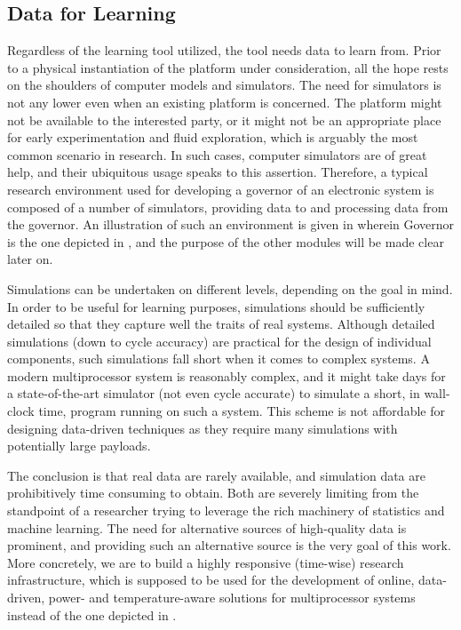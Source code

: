 \subsection{Data for Learning} 

Regardless of the learning tool utilized, the tool needs data to learn from.
Prior to a physical instantiation of the platform under consideration, all the
hope rests on the shoulders of computer models and simulators. The need for
simulators is not any lower even when an existing platform is concerned. The
platform might not be available to the interested party, or it might not be an
appropriate place for early experimentation and fluid exploration, which is
arguably the most common scenario in research. In such cases, computer
simulators are of great help, and their ubiquitous usage speaks to this
assertion. Therefore, a typical research environment used for developing a
governor of an electronic system is composed of a number of simulators,
providing data to and processing data from the governor. An illustration of such
an environment is given in  wherein Governor is the one
depicted in , and the purpose of the other modules will be made
clear later on.

Simulations can be undertaken on different levels, depending on the goal in
mind. In order to be useful for learning purposes, simulations should be
sufficiently detailed so that they capture well the traits of real systems.
Although detailed simulations (down to cycle accuracy) are practical for the
design of individual components, such simulations fall short when it comes to
complex systems. A modern multiprocessor system is reasonably complex, and it
might take days for a state-of-the-art simulator (not even cycle accurate) to
simulate a short, in wall-clock time, program running on such a system. This
scheme is not affordable for designing data-driven techniques as they require
many simulations with potentially large payloads.

The conclusion is that real data are rarely available, and simulation data are
prohibitively time consuming to obtain. Both are severely limiting from the
standpoint of a researcher trying to leverage the rich machinery of statistics
and machine learning. The need for alternative sources of high-quality data is
prominent, and providing such an alternative source is the very goal of this
work. More concretely, we are to build a highly responsive (time-wise) research
infrastructure, which is supposed to be used for the development of online,
data-driven, power- and temperature-aware solutions for multiprocessor systems
instead of the one depicted in .

